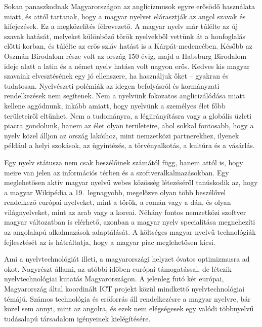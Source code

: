 \begin{multicols}{2}
  Sokan panaszkodnak Magyarországon az anglicizmusok egyre erősödő használata miatt, és attól tartanak, hogy a magyar nyelvet elárasztják  az angol szavak és kifejezések. Ez a megközelítés félrevezető. A magyar nyelv már túlélte az új szavak hatását, melyeket különböző török nyelvekből vettünk át a honfoglalás előtti korban, és túlélte az erős szláv hatást is a Kárpát-medencében. Később az Oszmán Birodalom része volt az ország 150 évig, majd a Habsburg Birodalom ideje alatt a latin és a német nyelv hatása volt nagyon erős. Kedves kis magyar szavaink elvesztésének egy jó ellenszere, ha használjuk őket -- gyakran és tudatosan. Nyelvészeti polémiák az idegen befolyásról és kormányzati rendelkezések nem segítenek. Nem a nyelvünk fokozatos anglicizálódása miatt kellene aggódnunk, inkább amiatt, hogy nyelvünk a személyes élet főbb területeiről eltűnhet. Nem a tudományra, a légiirányításra vagy a globális üzleti piacra gondolunk, hanem az élet olyan területeire, ahol sokkal fontosabb, hogy a nyelv közel álljon az ország lakóihoz, mint nemzetközi partnerekhez, ilyenek például a helyi szokások, az ügyintézés, a törvényalkotás, a kultúra és a vásárlás.    

  Egy nyelv státusza nem csak beszélőinek számától függ, hanem attól is, hogy meire van jelen az információs térben és a szoftveralkalmazásokban. Egy meglehetősen aktív magyar nyelvű webes közösség létezéséről tanúskodik az, hogy a magyar Wikipédia a 19.~leg\-na\-gyobb, megelőzve olyan több beszélővel rendelkező európai nyelveket, mint a török, a román vagy a dán, és olyan világnyelveket, mint az arab vagy a koreai. Néhány fontos nemzetközi szoftver magyar változatban is elérhető, azonban a magyar nyelv specialitása megnehezíti az angolalapú alkalmazások adaptálását. A költséges magyar nyelvű technológiák fejlesztését az is hátráltatja, hogy a magyar piac meglehetősen kicsi. 

  Ami a nyelvtechnológiát illeti, a magyarországi helyzet óvatos optimizmusra ad okot. Nagyrészt állami, az utóbbi időben európai támogatással, de létezik nyelvtechnológiai kutatás Magyarországon. A jelenleg futó két európai, Magyarország által koordinált ICT projekt közül mindkettő nyelvtechnológiai témájú. Számos technológia és erőforrás áll rendelkezésre a magyar nyelvre, bár közel sem annyi, mint az angolra, és ezek nem elégségesek egy valódi többnyelvű tudásalapú társadalom igényeinek kielégítésére.


\end{multicols}
